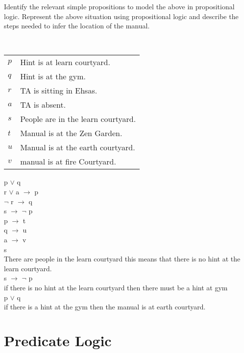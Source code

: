 \documentclass[addpoints]{exam}
\begin{document}
\begin{questions}
  Identify the relevant simple propositions to model the above in propositional logic. Represent the above situation using propositional logic and describe the steps needed to infer the location of the manual.
  \begin{solution}\\
    \begin{tabularx}{\textwidth}{l@{ : }X}
        $p$ & Hint is at learn courtyard.\\
        $q$ & Hint is at the gym.\\
        $r$ & TA is sitting in Ehsas.\\
        $a$ & TA is absent.\\
        $s$ & People are in the learn courtyard. \\
        $t$ & Manual is at the Zen Garden. \\
        $u$ & Manual is at the earth courtyard.\\
        $v$ & manual is at fire Courtyard.\\
        \end{tabularx}
        p $\lor$ q\\
        r $\lor$ a $\rightarrow$ p\\
        $\neg$ r $\rightarrow$ q\\
        s $\rightarrow$ $\neg$ p\\
        p $\rightarrow$ t\\
        q $\rightarrow$ u\\
        a $\rightarrow$ v\\
        s\\
        There are people in the learn courtyard this means that there is no hint at the learn courtyard.\\
        s $\rightarrow$ $\neg$ p\\
        if there is no hint at the learn courtyard then there must be a hint at gym\\
        p $\lor$ q\\
        if there is a hint at the gym then the manual is at earth courtyard.
  \end{solution}

\section*{Predicate Logic}
  
\question
  \begin{parts}

\end{parts}
\end{questions}
\end{document}
